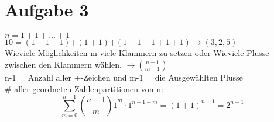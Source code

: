 \pagebreak
\section*{Aufgabe 3}
$ n = 1 +1+\ldots +1 $ \\
$10 = (1+1+1)\underline{+}(1+1)\underline{+}(1+1+1+1+1) \rightarrow (3,2,5)$ \\
Wieviele Möglichkeiten m viele Klammern zu setzen oder Wieviele Plusse zwischen den Klammern wählen. $ \rightarrow \binom{n-1}{m-1} $ \\
n-1 = Anzahl aller +-Zeichen und m-1 = die Ausgewählten Plusse \\
\# aller geordneten Zahlenpartitionen von n: $$ \sum_{m=0}^{n-1}\binom{n-1}{m} \dot 1^m \cdot 1^{n-1-m} = (1+1)^{ n-1 } = 2 ^{ n-1 }    $$